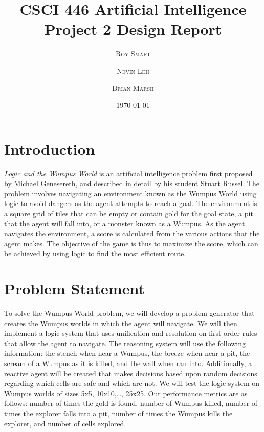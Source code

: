 \documentclass{article}
\title{\vspace{-15mm}\fontsize{24pt}{10pt}\selectfont\textbf{CSCI 446 Artificial Intelligence \\[2mm] Project 2 Design Report} } %
\date{\today}
\author{
\large
\textsc{Roy Smart} \and \textsc{Nevin Leh} \and \textsc{Brian Marsh}\\[2mm] %
}
\begin{document}
	\maketitle %
	\thispagestyle{fancy} %
	\normalsize

	\section{Introduction}
	
		\textit{Logic and the Wumpus World} is an artificial intelligence problem first proposed by Michael Genesereth, and described in detail by his student Stuart Russel\cite{ai}.  The problem involves navigating an environment known as the Wumpus World using logic to avoid dangers as the agent attempts to reach a goal.  The environment is a square grid of tiles that can be empty or contain gold for the goal state, a pit that the agent will fall into, or a monster known as a Wumpus.  As the agent navigates the environment, a score is calculated from the various actions that the agent makes.  The objective of the game is thus to maximize the score, which can be achieved by using logic to find the most efficient route.
	
	\section{Problem Statement}
	
		To solve the Wumpus World problem, we will develop a problem generator that creates the Wumpus worlds in which the agent will navigate.  We will then implement a logic system that uses unification and resolution on first-order rules that allow the agent to navigate.  The reasoning system will use the following information: the stench when near a Wumpus, the breeze when near a pit, the scream of a Wumpus as it is killed, and the wall when ran into.  Additionally, a reactive agent will be created that makes decisions based upon random decisions regarding which cells are safe and which are not.  We will test the logic system on Wumpus worlds of sizes {5x5, 10x10,…, 25x25}.  Our performance metrics are as follows: number of times the gold is found, number of Wumpus killed, number of times the explorer falls into a pit, number of times the Wumpus kills the explorer, and number of cells explored.
		
\end{document}
